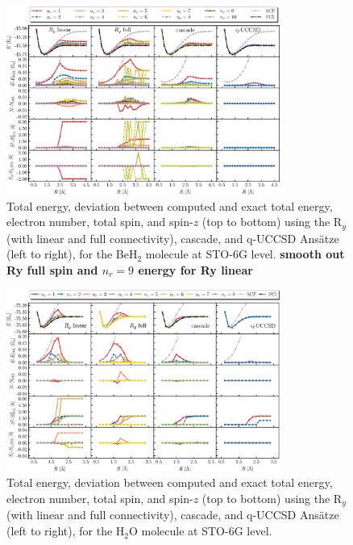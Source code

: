 \documentclass[aps,pra,onecolumn]{revtex4-2}
\newcommand{\todo}[1]{{\bf{{\color{red}#1}}}}
\begin{document}
\begin{figure}[t!]
\includegraphics[width=0.8\textwidth]{../figures/second_quantization_beh2/second_quantization_beh2.eps}
\caption{Total energy, deviation between computed and exact total energy, electron number, total spin, and spin-$z$ (top to bottom) 
using the R$_y$ (with linear and full connectivity), cascade, and q-UCCSD Ans\"{a}tze (left to right), for the BeH$_2$ molecule at STO-6G level.
\todo{smooth out Ry full spin and $n_r=9$ energy for Ry linear}
}
\label{figure:second_beh2}
\end{figure}

\begin{figure}[t!]
\includegraphics[width=0.8\textwidth]{../figures/second_quantization_h2o/second_quantization_h2o.eps}
\caption{Total energy, deviation between computed and exact total energy, electron number, total spin, and spin-$z$ (top to bottom) 
using the R$_y$ (with linear and full connectivity), cascade, and q-UCCSD Ans\"{a}tze (left to right), for the H$_2$O molecule at STO-6G level.}
\label{figure:second_h2o}
\end{figure} 
\end{document}
